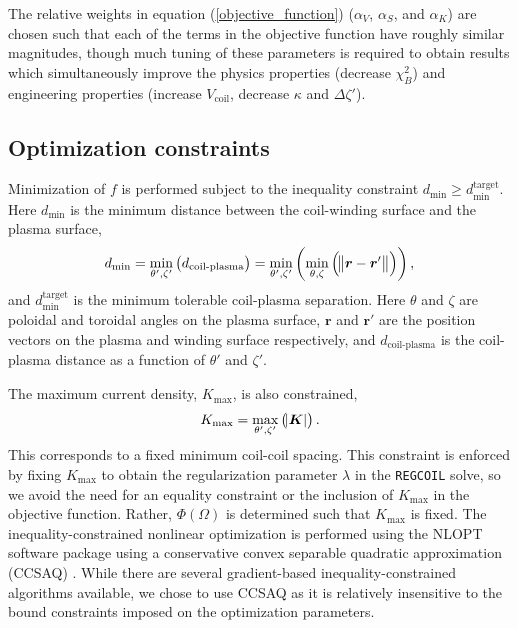 \documentclass[aps,unsortedaddress]{revtex4-1}
\begin{document}
The relative weights in equation (\ref{objective_function}) ($\alpha_V$, $\alpha_S$, and $\alpha_K$) are chosen such that each of the terms in the objective function have roughly similar magnitudes, though much tuning of these parameters is required to obtain results which simultaneously improve the physics properties (decrease $\chi^2_B$) and engineering properties (increase $V_{\text{coil}}$, decrease $\kappa$ and $\Delta \zeta'$).

\FloatBarrier
\subsection{Optimization constraints}
\label{sect_constraint}

Minimization of $f$ is performed subject to the inequality constraint $d_{\text{min}} \geq d_{\text{min}}^{\text{target}}$. Here $d_{\text{min}}$ is the minimum distance between the coil-winding surface and the plasma surface,
\begin{gather}
d_{\text{min}} = \min_{\theta',\zeta'} \left( d_{\text{coil-plasma}} \right) = \min_{\theta',\zeta'} \left( \min_{\theta, \zeta} \left( \norm{ \bm{r} - \bm{r}' } \right) \right),
\end{gather}
and $d_{\text{min}}^{\text{target}}$ is the minimum tolerable coil-plasma separation. Here $\theta$ and $\zeta$ are poloidal and toroidal angles on the plasma surface, $\bm{r}$ and $\bm{r}'$ are the position vectors on the plasma and winding surface respectively, and $d_{\text{coil-plasma}}$ is the coil-plasma distance as a function of $\theta'$ and $\zeta'$. 

The maximum current density, $K_{\text{max}}$, is also constrained,
\begin{gather}
K_{\text{max}} = \max_{\theta',\zeta'} \left( \abs{\bm{K}} \right).
\end{gather}
This corresponds to a fixed minimum coil-coil spacing. This constraint is enforced by fixing $K_{\text{max}}$ to obtain the regularization parameter $\lambda$ in the \texttt{REGCOIL} solve, so we avoid the need for an equality constraint or the inclusion of $K_{\text{max}}$ in the objective function. Rather, $\Phi(\Omega)$ is determined such that $K_{\text{max}}$ is fixed. The inequality-constrained nonlinear optimization is performed using the NLOPT \cite{NLOPT} software package using a conservative convex separable quadratic approximation (CCSAQ) \cite{Svanberg2002}. While there are several gradient-based inequality-constrained algorithms available, we chose to use CCSAQ as it is relatively insensitive to the bound constraints imposed on the optimization parameters. 
\end{document}
